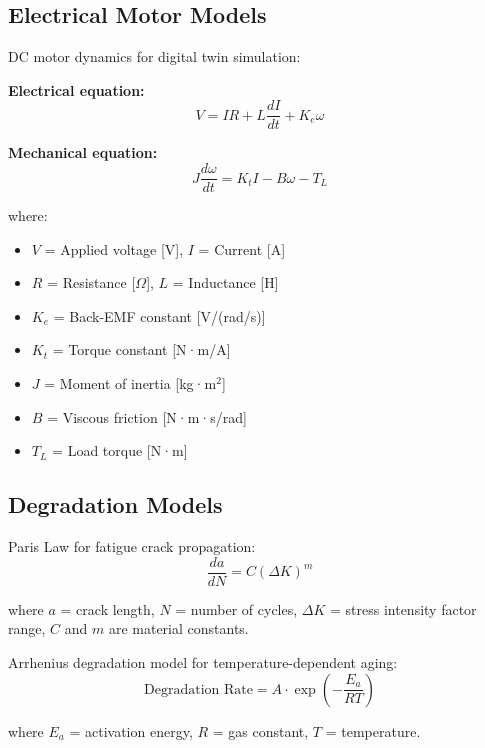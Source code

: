 \documentclass[12pt,a4paper]{article}
\begin{document}
\subsection{Electrical Motor Models}

DC motor dynamics for digital twin simulation:

\textbf{Electrical equation:}
\begin{equation}
V = IR + L\frac{dI}{dt} + K_e\omega
\end{equation}

\textbf{Mechanical equation:}
\begin{equation}
J\frac{d\omega}{dt} = K_t I - B\omega - T_L
\end{equation}

where:
\begin{itemize}
    \item $V$ = Applied voltage [V], $I$ = Current [A]
    \item $R$ = Resistance [$\Omega$], $L$ = Inductance [H]
    \item $K_e$ = Back-EMF constant [V/(rad/s)]
    \item $K_t$ = Torque constant [N·m/A]
    \item $J$ = Moment of inertia [kg·m$^2$]
    \item $B$ = Viscous friction [N·m·s/rad]
    \item $T_L$ = Load torque [N·m]
\end{itemize}

\subsection{Degradation Models}

Paris Law for fatigue crack propagation:
\begin{equation}
\frac{da}{dN} = C(\Delta K)^m
\end{equation}

where $a$ = crack length, $N$ = number of cycles, $\Delta K$ = stress intensity factor range, $C$ and $m$ are material constants.

Arrhenius degradation model for temperature-dependent aging:
\begin{equation}
\text{Degradation Rate} = A \cdot \exp\left(-\frac{E_a}{RT}\right)
\end{equation}

where $E_a$ = activation energy, $R$ = gas constant, $T$ = temperature.

\end{document}
